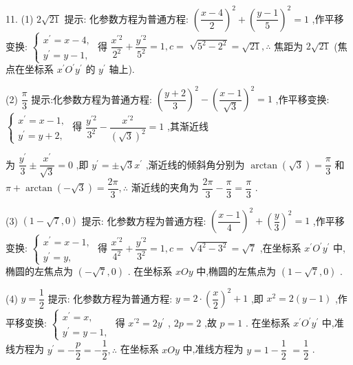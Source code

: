 11. (1) $2\sqrt{21}$ 提示: 化参数方程为普通方程: ${\left( \dfrac{x - 4}{2}\right) }^{2} + {\left( \dfrac{y - 1}{5}\right) }^{2} = 1$ ,作平移变换: $\left\{  \begin{array}{l} {x}^{\prime } = x - 4, \\  {y}^{\prime } = y - 1, \end{array}\right.$ 得 $\dfrac{{x}^{\prime 2}}{{2}^{2}} + \dfrac{{y}^{\prime 2}}{{5}^{2}} = 1,c =$  $\sqrt{{5}^{2} - {2}^{2}} = \sqrt{21},\therefore$ 焦距为 $2\sqrt{21}$ (焦点在坐标系 ${x}^{\prime }{O}^{\prime }{y}^{\prime }$ 的 ${y}^{\prime }$ 轴上).

(2) $\dfrac{\pi }{3}$ 提示:化参数方程为普通方程: ${\left( \dfrac{y + 2}{3}\right) }^{2} - {\left( \dfrac{x - 1}{\sqrt{3}}\right) }^{2} = 1$ ,作平移变换: $\left\{  \begin{array}{l} {x}^{\prime } = x - 1, \\  {y}^{\prime } = y + 2, \end{array}\right.$ 得 $\dfrac{{y}^{\prime 2}}{{3}^{2}} - \dfrac{{x}^{\prime 2}}{{\left( \sqrt{3}\right) }^{2}} = 1$ ,其渐近线

为 $\dfrac{{y}^{\prime }}{3} \pm  \dfrac{{x}^{\prime }}{\sqrt{3}} = 0$ ,即 ${y}^{\prime } =  \pm  \sqrt{3}{x}^{\prime }$ ,渐近线的倾斜角分别为 $\arctan \left( \sqrt{3}\right)  = \dfrac{\pi }{3}$ 和 $\pi  + \arctan \left( {-\sqrt{3}}\right)  = \dfrac{2\pi }{3},\therefore$ 渐近线的夹角为 $\dfrac{2\pi }{3} - \dfrac{\pi }{3} = \dfrac{\pi }{3}$ .

(3) $\left( {1 - \sqrt{7},0}\right)$ 提示: 化参数方程为普通方程: ${\left( \dfrac{x - 1}{4}\right) }^{2} + {\left( \dfrac{y}{3}\right) }^{2} = 1$ ,作平移变换: $\left\{  \begin{array}{l} {x}^{\prime } = x - 1, \\  {y}^{\prime } = y, \end{array}\right.$ 得 $\dfrac{{x}^{\prime 2}}{{4}^{2}} + \dfrac{{y}^{\prime 2}}{{3}^{2}} = 1,c =$  $\sqrt{{4}^{2} - {3}^{2}} = \sqrt{7}$ ,在坐标系 ${x}^{\prime }{O}^{\prime }{y}^{\prime }$ 中,椭圆的左焦点为 $\left( {-\sqrt{7},0}\right)$ . 在坐标系 ${xOy}$ 中,椭圆的左焦点为 $\left( {1 - \sqrt{7},0}\right)$ .

(4) $y = \dfrac{1}{2}$ 提示: 化参数方程为普通方程: $y = 2 \cdot  {\left( \dfrac{x}{2}\right) }^{2} + 1$ ,即 ${x}^{2} = 2\left( {y - 1}\right)$ ,作平移变换: $\left\{  \begin{array}{l} {x}^{\prime } = x, \\  {y}^{\prime } = y - 1, \end{array}\right.$ 得 ${x}^{\prime 2} = 2{y}^{\prime }$ , ${2p} = 2$ ,故 $p = 1$ . 在坐标系 ${x}^{\prime }{O}^{\prime }{y}^{\prime }$ 中,准线方程为 ${y}^{\prime } =  - \dfrac{p}{2} =  - \dfrac{1}{2},\therefore$ 在坐标系 ${xOy}$ 中,准线方程为 $y = 1 - \dfrac{1}{2}$  $= \dfrac{1}{2}$ .

